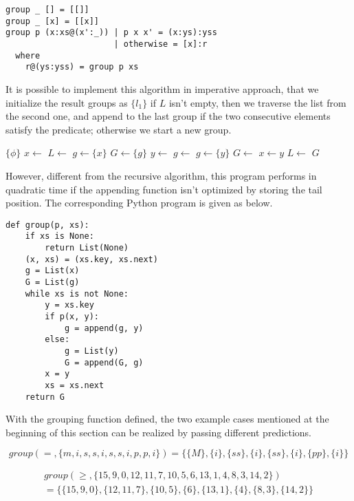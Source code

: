 \documentclass[UTF8]{article}
\begin{document}
\lstset{language=Haskell}
\begin{lstlisting}
group _ [] = [[]]
group _ [x] = [[x]]
group p (x:xs@(x':_)) | p x x' = (x:ys):yss
                      | otherwise = [x]:r
  where
    r@(ys:yss) = group p xs
\end{lstlisting}

It is possible to implement this algorithm in imperative approach, that we initialize the result groups as
$\{{l_1\}}$ if $L$ isn't empty, then we traverse the list from the second one, and append to the last group
if the two consecutive elements satisfy the predicate; otherwise we start a new group.

\begin{algorithmic}[1]
    \State \Return $\{ \phi \}$
  \EndIf
  \State $x \gets$ 
  \State $L \gets$ 
  \State $g \gets \{ x \}$
  \State $G \gets \{ g \}$
    \State $y \gets$ 
      \State $g \gets $ 
    \Else
      \State $g \gets \{y\}$
      \State $G \gets$ 
    \EndIf
    \State $x \gets y$
    \State $L \gets$ 
  \EndWhile
  \State \Return $G$
\EndFunction
\end{algorithmic}

However, different from the recursive algorithm, this program performs in quadratic time if the appending
function isn't optimized by storing the tail position.
The corresponding Python program is given as below.

\lstset{language=Python}
\begin{lstlisting}
def group(p, xs):
    if xs is None:
        return List(None)
    (x, xs) = (xs.key, xs.next)
    g = List(x)
    G = List(g)
    while xs is not None:
        y = xs.key
        if p(x, y):
            g = append(g, y)
        else:
            g = List(y)
            G = append(G, g)
        x = y
        xs = xs.next
    return G
\end{lstlisting}

With the grouping function defined, the two example cases mentioned at the beginning of this section can be
realized by passing different predictions.

\[
group(=, \{m,i,s,s,i,s,s,i,p,p,i\}) = \{ \{M\}, \{i\}, \{ss\}, \{i\}, \{ss\}, \{i\}, \{pp\}, \{i\} \}
\]

\[
\begin{array}{l}
group(\geq,  \{15, 9, 0, 12, 11, 7, 10, 5, 6, 13, 1, 4, 8, 3, 14, 2\}) \\
  = \{ \{15, 9, 0\}, \{12, 11, 7\}, \{10, 5\}, \{6\}, \{13, 1\}, \{4\}, \{8, 3\}, \{14, 2\}\}
\end{array}
\]
\end{document}
